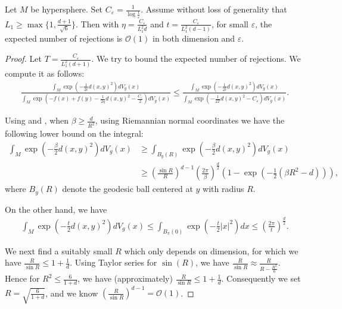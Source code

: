 \begin{proposition}\label{Prop_expected_rej}
    Let $M$ be hypersphere. 
    Set $C_{\varepsilon} = \frac{1}{\log \frac{1}{\varepsilon}}$.
    Assume without loss of generality that $L_{1} \ge \max\{1, \frac{d+1}{\sqrt{6}}\}$. Then with $\eta = \frac{C_{\varepsilon}}{L_{1}^{2} d}$ and $t = \frac{C_{\varepsilon}}{L_{1}^{2}(d-1)}$, for small $\varepsilon$,
    the expected number of rejections is $\mathcal{O}(1)$ in both dimension and $\varepsilon$.
\end{proposition}
\begin{proof}
    Let $T = \frac{C_{\varepsilon}}{L_{1}^{2}(d+1)}$.
    We try to bound the expected number of rejections. 
    We compute it as follows:
    \begin{align*}
            \frac{\int_{M} \exp(-\frac{1}{2t} d(x, y)^{2}) dV_{g}(x)}{\int_{M} \exp(- f(x) + f(y) - \frac{1}{2\eta} d(x, y)^{2} - \frac{C_{\varepsilon}}{2}) dV_{g}(x)}
            \le 
            \frac{\int_{M} \exp(-\frac{1}{2t} d(x, y)^{2}) dV_{g}(x)}{\int_{M} \exp(- \frac{1}{2T} d(x, y)^{2} - C_{\varepsilon}) dV_{g}(x)}.
    \end{align*}

    Using \citet[Lemma 8.2]{li2023riemannian} and \citet[Lemma C.5]{li2023riemannian}, 
    when $\beta \ge \frac{d}{R^{2}}$, using Riemannian normal coordinates we have the following lower bound on the integral: 
    \begin{align*}
            \int_{M} \exp(-\frac{\beta}{2} d(x, y)^{2}) dV_{g}(x) 
            &\ge \int_{B_{y}(R)} \exp(-\frac{\beta}{2} d(x, y)^{2}) dV_{g}(x) \\
            &\ge (\frac{\sin R}{R})^{d-1} (\frac{2\pi}{\beta})^{\frac{d}{2}}(1 - \exp(-\frac{1}{2}( \beta R^{2} - d))),
    \end{align*}
    where $B_{y}(R)$ denote the geodesic ball centered at $y$ with radius $R$.
    
    On the other hand, we have 
    \begin{align*}
        \int_{M} \exp(-\frac{t}{2} d(x, y)^{2}) dV_{g}(x)
            \le \int_{B_{\pi}(0)} \exp(-\frac{t}{2} |x|^{2}) dx
            \le (\frac{2\pi}{t})^{\frac{d}{2}}.
    \end{align*}

    We next find a suitably small $R$ which only depends on dimension, for which we have $\frac{R}{\sin R} \le 1 + \frac{1}{d}$.
    Using Taylor series for $\sin(R)$, we have $\frac{R}{\sin R} \approx \frac{R}{R-\frac{R^{3}}{6}}$. Hence for $ R^{2} \le \frac{6}{1+d}$, we have (approximately) $\frac{R}{\sin R} \le 1 + \frac{1}{d}$. Consequently we set $R = \sqrt{\frac{6}{1+d}}$, and we know $(\frac{R}{\sin R})^{d-1} = \mathcal{O}(1)$.
    

\end{proof}
